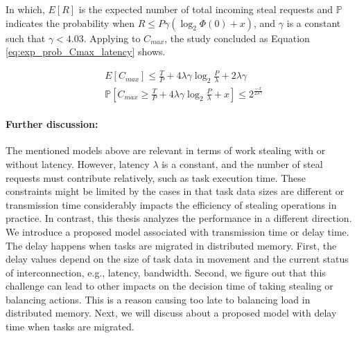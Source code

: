 In which, $E[R]$ is the expected number of total incoming steal requests and $\mathbb{P}$ indicates the probability when $R \leq P \gamma (\log_{2} \Phi(0) + x)$, and $\gamma$ is a constant such that $\gamma < 4.03$. Applying to $C_{max}$, the study concluded as Equation \ref{eq:exp_prob_Cmax_latency} shows.

\begin{equation} \label{eq:exp_prob_Cmax_latency}
\begin{split}
	& E[C_{max}] \leq \frac{T}{P} + 4\lambda\gamma\log_{2} \frac{P}{\lambda} + 2\lambda\gamma \\
	& \mathbb{P}[C_{max} \geq \frac{T}{P} + 4\lambda\gamma\log_{2} \frac{P}{\lambda} + x] \leq 2^{\frac{-x}{2\lambda\gamma}}
\end{split}
\end{equation}


\paragraph{Further discussion:}
The mentioned models above are relevant in terms of work stealing with or without latency. However, latency $\lambda$ is a constant, and the number of steal requests must contribute relatively, such as task execution time. These constraints might be limited by the cases in that task data sizes are different or transmission time considerably impacts the efficiency of stealing operations in practice. In contrast, this thesis analyzes the performance in a different direction. We introduce a proposed model associated with transmission time or delay time. The delay happens when tasks are migrated in distributed memory. First, the delay values depend on the size of task data in movement and the current status of interconnection, e.g., latency, bandwidth. Second, we figure out that this challenge can lead to other impacts on the decision time of taking stealing or balancing actions. This is a reason causing too late to balancing load in distributed memory. Next, we will discuss about a proposed model with delay time when tasks are migrated.
